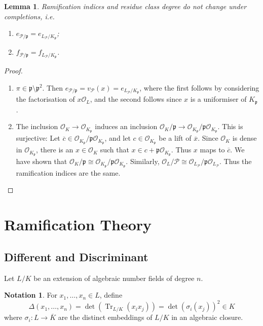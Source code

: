 \documentclass[11pt]{article}
\theoremstyle{definition}
\newtheorem*{notation}{Notation}
\theoremstyle{plain}
\newtheorem*{lemma*}{Lemma}
\theoremstyle{remark}
\DeclareMathOperator{\Tr}{Tr}
\newcommand{\cO}{\mathcal{O}}
\newcommand{\cP}{\mathcal{P}}
\newcommand{\fp}{\mathfrak{p}}
\begin{document}
\begin{lemma*}
    Ramification indices and residue class degree do not change under completions, i.e.
    \begin{enumerate}
        \item $e_{\cP / \fp} = e_{L_\cP / K_\fp}$;
        \item $f_{\cP / \fp} = f_{L_\cP / K_\fp}$.
    \end{enumerate}
\end{lemma*}
\begin{proof}\phantom{}
    \begin{enumerate}
        \item $\pi \in \fp \setminus \fp^2$. Then $e_{\cP / \fp} =v_\cP(x) = e_{L_\cP / K_\fp}$, where the first follows by considering the factorisation of $x \cO_L$, and the second follows since $x$ is a uniformiser of $K_\fp$.

        \item The inclusion $\cO_K \to \cO_{K_\fp}$ induces an inclusion $\cO_K / \fp \to \cO_{K_\fp} / \fp \cO_{K_\fp}$. This is surjective: Let $\overline{c} \in \cO_{K_\fp} / \fp\cO_{K_\fp}$, and let $c \in \cO_{K_\fp}$ be a lift of $\overline{x}$. Since $\cO_K$ is dense in $\cO_{K_\fp}$, there is an $x \in \cO_K$ such that $x \in c + \fp \cO_{K_\fp}$. Thus $x$ maps to $\overline{c}$. We have shown that $\cO_K / \fp \cong \cO_{K_\fp} / \fp \cO_{K_\fp}$. Similarly, $\cO_L / \cP \cong \cO_{L_\cP} / \fp \cO_{L_\cP}$. Thus the ramification indices are the same. \qedhere
    \end{enumerate}
\end{proof}

\section{Ramification Theory}

\subsection{Different and Discriminant}

Let $L / K$ be an extension of algebraic number fields of degree $n$.

\begin{notation}
    For $x_1, \ldots, x_n \in L$, define
    \begin{equation*}
        \Delta(x_1, \ldots, x_n) = \det(\Tr_{L/K}(x_i x_j)) = \det(\sigma_i(x_j))^2 \in K
    \end{equation*}
    where $\sigma_i : L \to \overline{K}$ are the distinct embeddings of $L/K$ in an algebraic closure.
\end{notation}
\end{document}
